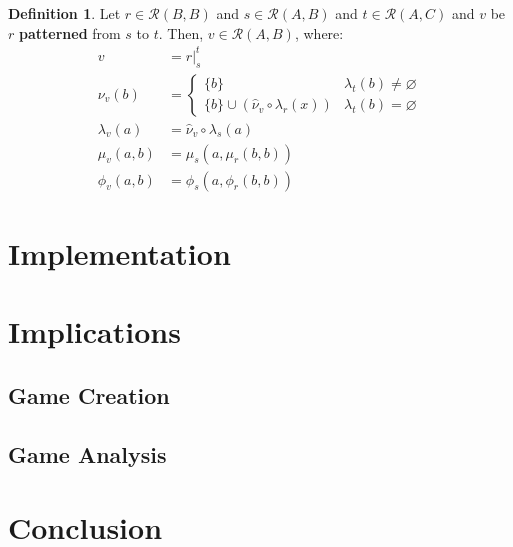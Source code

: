 \documentclass{article}
\theoremstyle{definition}
\newtheorem{definition}{Definition}[section]
\theoremstyle{plain}
\def\rule{\mathcal{R}}
\begin{document}
\begin{definition}
  Let $ r \in \rule (B, B) $
  and $ s \in \rule (A, B) $
  and $ t \in \rule (A, C) $
  and $ v $ be $ r $ \textbf{patterned} from $ s $ to $ t $.
  Then, $ v \in \rule (A, B) $, where:
  \begin{align}
          v        & = r \rvert_{s}^{t} \\
      \nu_v (b)    & = \begin{cases}
                         \{ b \}                                            & \lambda_t (b) \neq \varnothing \\
                         \{ b \} \cup (\widehat{\nu}_v \circ \lambda_r (x)) & \lambda_t (b) =    \varnothing
                       \end{cases} \\
  \lambda_v (a)    & = \widehat{\nu}_v \circ \lambda_s (a) \\
      \mu_v (a, b) & =  \mu_s (a,  \mu_r (b, b)) \\
     \phi_v (a, b) & = \phi_s (a, \phi_r (b, b)) 
  \end{align}
\end{definition}

\section{Implementation}

\section{Implications}

\subsection{Game Creation}

\subsection{Game Analysis}

\section{Conclusion}
\end{document}
